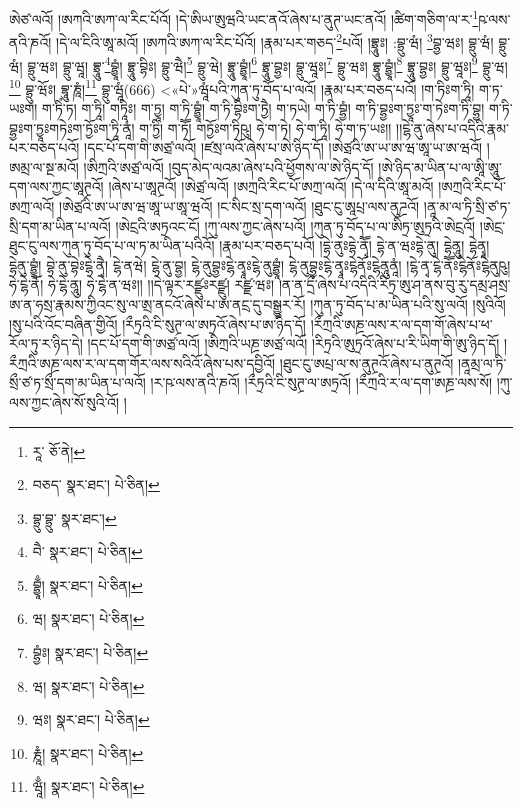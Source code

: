 ཨེཙ་ལའོ། །ཨཀའི་ཨཀ་ལ་རིང་པོའོ། །དེ་ཨིཡ་ཨུཝའི་ཡང་ནའོ་ཞེས་པ་ནུཊ་ཡང་ནའོ། །ཚིག་གཅིག་ལ་ར་\footnote{རཱ་  ཅོ་ནེ། }ཥ་ལས་ནའི་ཎའོ། །དེ་ལ་ངིའི་ཨཱ་མའོ། །ཨཀའི་ཨཀ་ལ་རིང་པོའོ། །རྣམ་པར་གཅད་\footnote{བཅད་  སྣར་ཐང་།  པེ་ཅིན། }པའོ། །བྷྲཱུཿ། :བྷྲུ་ཝཾ། \footnote{བྷྲུ་བྷྲུ་  སྣར་ཐང་། }བྷྱ་ཝཿ། བྷྲུ་ཝཾ། བྷྲུ་ཝཾ། བྷྲུ་ཝཿ། བྷྲུ་ཝཱ། བྷྲཱུ་\footnote{བཻ་  སྣར་ཐང་།  པེ་ཅིན། }བྷྱཱཾ། བྷྲཱུ་བྷིཿ། བྷྲུ་ཝཻ།\footnote{བྷྱཱྃ།  སྣར་ཐང་།  པེ་ཅིན། } བྷྲུ་ཝེ། བྷྲཱུ་བྷྱཱཾ།\footnote{ཝ།  སྣར་ཐང་།  པེ་ཅིན། } བྷྲཱུ་བྷྱཿ། བྷྲུ་ཝཱཿ།\footnote{བྷྱཾཿ།  སྣར་ཐང་།  པེ་ཅིན། } བྷྲུ་ཝཿ། བྷྲཱུ་བྷྱཱཾ།\footnote{ཝ།  སྣར་ཐང་།  པེ་ཅིན། } བྷྲཱུ་བྷྱཿ། བྷྲུ་ཝཱཿ།\footnote{ཝཿ།  སྣར་ཐང་།  པེ་ཅིན། } བྷྲུ་ཝ།\footnote{རྞཱཾ།  སྣར་ཐང་།  པེ་ཅིན། } བྷྲུ་ཝོཿ། བྷཱུ་ཎཱཾ།\footnote{ཝཱྃ།  སྣར་ཐང་།  པེ་ཅིན། } བྷྲུ་ཝཱཾ(666) <«པེ་»ཝཱཾཔའི་ཀུན་ཏུ་བོད་པ་ལའོ། །རྣམ་པར་བཅད་པའོ། །ག་ཏིཿག་ཏཱི། ག་ཏ་ཡཿག། ག་ཏིཾ་ཏ། ག་ཏཱི། གཏཱིཿ། ག་ཏྱཱ། ག་ཏི་བྷྱཱཾ། ག་ཏི་བྷིཿག་ཏྱཻ། ག་ཏཡེ། ག་ཏི་བྷྱཾ། ག་ཏི་བྷྱཿག་ཏྱཱཿ་ག་ཏེཿག་ཏི་བྷྱ། ག་ཏི་བྷྱཿག་ཏྱཱཿགཏེཿག་ཏྱོཿག་ཏཱི་ནཱཾ། ག་ཏྱི། ག་ཏཽ། གཏྱོཿག་ཏིཥུ། ཧེ་ག་ཏེ། ཧེ་ག་ཏཱི། ཧེ་ག་ཏ་ཡཿ།། །།ངྷེ་ནུ་ཞེས་པ་འདིའི་རྣམ་པར་བཅད་པའོ། །དང་པོ་དག་གི་ཨཙྲ་ལའོ། །ཛསྲ་ལའོ་ཞེས་པ་ཨེ་ཉིད་དོ། །ཨེཙྲའི་ཨ་ཡ་ཨ་ཝ་ཨཱ་ཡ་ཨ་ཝའོ། །ཨམྲ་ལ་སྔ་མའོ། །ཨིཀྲའི་ཨཙྲ་ལའོ། །བུད་མེད་ལའམ་ཞེས་པའི་ཕྱོགས་ལ་ཨེ་ཉིད་དོ། །ཨེ་ཉིད་མ་ཡིན་པ་ལ་ཨཱི་ཨཱུ་དག་ལས་ཀྱང་ཨཱཊྲའོ། །ཞེས་པ་ཨཱཊྲའོ། །ཨེཙྲ་ལའོ། །ཨཀྲའི་རིང་པོ་ཨཀྲ་ལའོ། །དེ་ལ་དིའི་ཨཱ་མའོ། །ཨཀྲའི་རིང་པོ་ཨཀྲ་ལའོ། །ཨེཙྲའི་ཨ་ཡ་ཨ་ཝ་ཨཱ་ཡ་ཨཱ་ཝའོ། །ང་སིང་སྲ་དག་ལའོ། །ཐུང་ངུ་ཨཱཔྲ་ལས་ནུཌྲའོ། །ནཱ་མ་ལ་ཏི་སྲི་ཙ་ཏ་སྲི་དག་མ་ཡིན་པ་ལའོ། །ཨེངྲའི་ཨཏྲའང་ངོ། །ཀུ་ལས་ཀྱང་ཞེས་པའོ། །ཀུན་ཏུ་བོད་པ་ལ་ཨིཏྲ་ཨུཏྲའི་ཨེངྲའོ། །ཨེངྲ་ཐུང་ངུ་ལས་ཀུན་ཏུ་བོད་པ་ལ་ཏ་མ་ཡིན་པའིའོ། །རྣམ་པར་བཅད་པའོ། །དྷེ་ནུཿདྷེ་ནྭཽ། དྷེ་ན་ཝཿདྷེ་ནུ། དྷེནཱུ། དྷེནྭཱ། དྷེནུ་བྷྱཱཾ། བྷེ་ནུ་བྷེཿངྷེ་ནྭཻ། ངྷེ་ནཝེ། ངྷེ་ནུ་བྷྱ། ངྷེ་ནུབྷྱཿངྷེ་ནྭཱཿངྷེ་ནུབྷྱཱཾ། ངྷེ་ནུབྷྱཿངྷེ་ནྭཱཿངྷེནོཿངྷེནཱུནཱཾ། །ངྷེ་ནྭ་ངྷེ་ནཽཿངྷེནོཿངྷེནུཥུ། ཧེ་ངྷེ་ནོ། ཧེ་ངྷེ་ནཱུ། ཧེ་ངྷེ་ན་ཝཿ།། །།དེ་ལྟར་རཛྫུཿརཛྫུ། རཛྫ་ཝཿ། །ན་ན་དྲྀ་ཞེས་པ་འདིའི་རིཏྲ་ཨུ་ཤ་ནས་བུ་རུ་དམྲ་ཤསྲ་ཨ་ན་ཧསྲ་རྣམས་ཀྱིའང་སུ་ལ་ཨྲ་ནངའོ་ཞེས་པ་ཨ་ནངྲ་དུ་བསྒྱུར་རོ། །ཀུན་ཏུ་བོད་པ་མ་ཡིན་པའི་སུ་ལའོ། །སུའིའོ། །སུ་པའི་འོང་བཞིན་གྱིའོ། །རྀཏྲའི་ངི་སུཊྲ་ལ་ཨཏྲའོ་ཞེས་པ་ཨ་ཉིད་དོ། །རྀཀྲའི་ཨཎྲ་ལས་ར་ལ་དག་གོ་ཞེས་པ་ཕ་རོལ་ཏུ་ར་ཉིད་དེ། །དང་པོ་དག་གི་ཨཙྲ་ལའོ། །ཨིཀྲའི་ཡཎྲ་ཨཙྲ་ལའོ། །རིཏྲའི་ཨུཏྲའོ་ཞེས་པ་རི་ཡིག་གི་ཨུ་ཉིད་དོ། །རྀཀྲའི་ཨཎྲ་ལས་ར་ལ་དག་གོར་ལས་སའིའོ་ཞེས་པས་དབྱིའོ། །ཐུང་ངུ་ཨཔྲ་ལ་ས་ནུཊྲའོ་ཞེས་པ་ནུཊྲའོ། །ནཱམྲ་ལ་ཏི་སྲྀ་ཙ་ཏ་སྲྀ་དག་མ་ཡིན་པ་ལའོ། །ར་ཥ་ལས་ནའི་ཎའོ། །རྀཏྲའི་ངི་སུཊྲ་ལ་ཨཏྲའོ། །རྀཀྲའི་ར་ལ་དག་ཨཎྲ་ལས་སོ། །ཀུ་ལས་ཀྱང་ཞེས་སོ་སུའི་འོ། །
